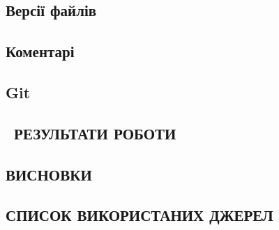 \documentclass[a4paper,14pt]{extarticle}
\numberwithin{figure}{section}
\begin{document}
    \newpage
    \subsection{\large Версії файлів}
    
    \newpage
    \subsection{\large Коментарі}

    \newpage
    \subsection{\large Git}
    
    \newpage
    \begin{center}
        \section{\large \ РЕЗУЛЬТАТИ РОБОТИ}
    \end{center}

    
    \newpage
    \begin{center}
         \section*{\large ВИСНОВКИ}
    \end{center}
    
    \newpage
    \begin{center}
          \section*{\large СПИСОК ВИКОРИСТАНИХ ДЖЕРЕЛ}  
    \end{center}
    
\end{document}

